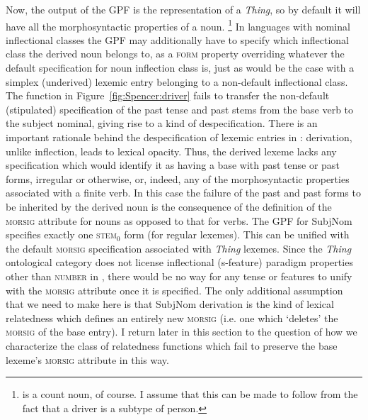 \documentclass[output=paper]{langsci/langscibook}
\begin{document}
Now, the output of the GPF is the representation of a \textit{Thing}, so by default it will have all the morphosyntactic properties of a noun.%
\footnote{ is a count noun, of course. I assume that this can be made to follow from the fact that a driver is a subtype of person.} %
In languages with nominal inflectional classes the GPF may additionally have to specify which inflectional class the derived noun belongs to, as a \textsc{form} property overriding whatever the default specification for noun inflection class is, just as would be the case with a simplex (underived) lexemic entry belonging to a non-default inflectional class.
The function in Figure~\ref{fig:Spencer:driver} fails to transfer the non-default (stipulated) specification of the past tense and past  stems from the base verb to the subject nominal, giving rise to a kind of despecification.  %
There is an important rationale behind the despecification of lexemic entries in %
\citet{Spencer13}%
%
: derivation, unlike inflection, leads to lexical opacity. %
Thus, the derived lexeme  lacks any specification which would identify it as having a base with past tense or past  forms, irregular or otherwise, or, indeed, any of the morphosyntactic properties associated with a finite verb. In this case the failure of the past and past  forms to be inherited by the derived noun is the consequence of the definition of the \textsc{morsig} attribute for nouns as opposed to that for verbs. The GPF for SubjNom specifies exactly one \textsc{stem$_0$} form (for regular lexemes). This can be unified with the default \textsc{morsig} specification associated with \textit{Thing} lexemes. Since the \textit{Thing} ontological category does not license inflectional (s-feature) paradigm properties other than \textsc{number} in , there would be no way for any tense or  features to unify with the \textsc{morsig} attribute once it is specified. The only additional assumption that we need to make here is that SubjNom derivation is the kind of lexical relatedness which defines an entirely new \textsc{morsig} (i.e. one which `deletes' the \textsc{morsig} of the base entry). I return later in this section to the question of how we characterize the class of relatedness functions which fail to preserve the base lexeme's \textsc{morsig} attribute in this way.
\end{document}
